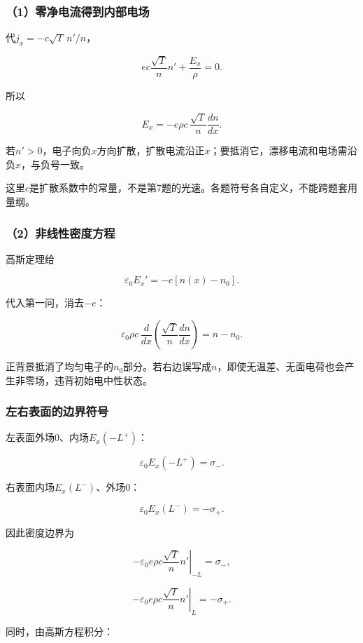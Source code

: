 \documentclass[12pt,a4paper,fontset=fandol]{ctexart}
\begin{document}
\subsubsection{（1）零净电流得到内部电场}\label{ux96f6ux51c0ux7535ux6d41ux5f97ux5230ux5185ux90e8ux7535ux573a}

代\(j_x=-c\sqrt T\,n'/n\)，

\[
ec\frac{\sqrt T}{n}n'+\frac{E_x}{\rho}=0.
\]

所以

\[
\boxed{E_x=-e\rho c\,\frac{\sqrt T}{n}\frac{dn}{dx}}.
\]

若\(n'>0\)，电子向负\(x\)方向扩散，扩散电流沿正\(x\)；要抵消它，漂移电流和电场需沿负\(x\)，与负号一致。

这里\(c\)是扩散系数中的常量，不是第7题的光速。各题符号各自定义，不能跨题套用量纲。

\subsubsection{（2）非线性密度方程}\label{ux975eux7ebfux6027ux5bc6ux5ea6ux65b9ux7a0b}

高斯定理给

\[
\boxed{\varepsilon_0E_x'=-e[n(x)-n_0]}.
\]

代入第一问，消去\(-e\)：

\[
\boxed{
\varepsilon_0\rho c\,
\frac d{dx}\left(\frac{\sqrt T}{n}\frac{dn}{dx}\right)
=n-n_0}.
\]

正背景抵消了均匀电子的\(n_0\)部分。若右边误写成\(n\)，即使无温差、无面电荷也会产生非零场，违背初始电中性状态。

\subsubsection{左右表面的边界符号}\label{ux5de6ux53f3ux8868ux9762ux7684ux8fb9ux754cux7b26ux53f7}

左表面外场0、内场\(E_x(-L^+)\)：

\[
\varepsilon_0E_x(-L^+)=\sigma_-.
\]

右表面内场\(E_x(L^-)\)、外场0：

\[
\varepsilon_0E_x(L^-)=-\sigma_+.
\]

因此密度边界为

\[
\boxed{
-\varepsilon_0e\rho c
\left.\frac{\sqrt T}{n}n'\right|_{-L}=\sigma_-},
\]

\[
\boxed{
-\varepsilon_0e\rho c
\left.\frac{\sqrt T}{n}n'\right|_{L}=-\sigma_+}.
\]

同时，由高斯方程积分：
\end{document}
